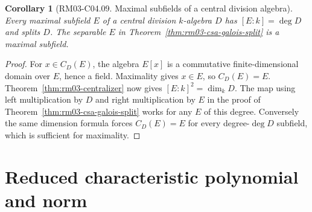 \documentclass[11pt,oneside,openany]{book}
\newtheorem{corollary}[theorem]{Corollary}
\theoremstyle{definition}
\theoremstyle{remark}
\begin{document}
\begin{corollary}[RM03-C04.09. Maximal subfields of a central division algebra]
\label{cor:rm03-maximal-subfield}
Every maximal subfield \(E\) of a central division \(k\)-algebra
\(D\) has \([E:k]=\deg D\) and splits \(D\). The separable \(E\)
in Theorem~\ref{thm:rm03-csa-galois-split} is a maximal subfield.
\end{corollary}
\begin{proof}
For \(x\in C_D(E)\), the algebra \(E[x]\) is a commutative
finite-dimensional domain over \(E\), hence a field. Maximality
gives \(x\in E\), so \(C_D(E)=E\). Theorem~\ref{thm:rm03-centralizer}
now gives \([E:k]^2=\dim_k D\). The map using left multiplication
by \(D\) and right multiplication by \(E\) in the proof of
Theorem~\ref{thm:rm03-csa-galois-split} works for any \(E\) of
this degree. Conversely the same dimension formula forces
\(C_D(E)=E\) for every degree-\(\deg D\) subfield, which is
sufficient for maximality.
\end{proof}

\section{Reduced characteristic polynomial and norm}
\end{document}
